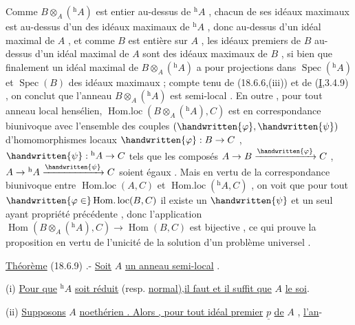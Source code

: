  Comme $B\otimes_A({}^{\mathrm h}A)$ est
entier au-dessus de $ {}^{\mathrm h}A$ , chacun de ses idéaux maximaux est au-dessus d'un
des idéaux maximaux de $ {}^{\mathrm h}A$ , donc au-dessus d'un idéal maximal de $A$ , et comme
$B$ est entière sur $A$ , les idéaux premiers de $B$ au-dessus d'un idéal maximal
de $A$ sont des idéaux maximaux de $B$ , si bien que finalement un idéal maximal
de $B\otimes_A({}^{\mathrm h}A)$ a pour projections dans $\operatorname{Spec}({}^{\mathrm h}A)$ et $\operatorname{Spec}(B)$ des idéaux maximaux
; compte tenu de (18.6.6,(iii)) et de (\uline{I},3.4.9) , on conclut que l'anneau
$B\otimes_A({}^{\mathrm h}A)$ est semi-local . En outre , pour tout anneau local hensélien,
$\operatorname{Hom.loc}(B\otimes_A({}^{\mathrm h}A),C)$ est en correspondance biunivoque avec l'ensemble des
couples $(\handwritten{\varphi},\handwritten{\psi})$ d'homomorphismes locaux $\handwritten{\varphi}:B\to C$ , $\handwritten{\psi}:{}^{\mathrm h}A\to C$ tels que les composés
$A\to B\xrightarrow{\handwritten{\varphi}}C$ , $A\to{}^{\mathrm h}A\xrightarrow{\handwritten{\psi}}C$ soient égaux . Mais  en vertu
de la correspondance biunivoque entre $\operatorname{Hom.loc}(A,C)$ et $\operatorname{Hom.loc}({}^{\mathrm h}A,C)$ , on
voit que pour tout $\handwritten{\varphi\in}\operatorname{Hom.loc}(B,C)$ il existe un $\handwritten{\psi}$ et un seul ayant   propriété
précédente , donc l'application $\operatorname{Hom}(B\otimes_A({}^{\mathrm h}A),C)\to\operatorname{Hom}(B,C)$ est bijective
, ce qui prouve la proposition en vertu de l'unicité de la solution
d'un problème universel .

\uline{Théorème} (18.6.9) .- \uline{Soit} $A$ \uline{un anneau semi-local} .

(i) \uline{Pour que} $ {}^{\mathrm h}A$ \uline{soit réduit} (resp. \uline{normal),il faut et il suffit que} $A$ \uline{le soi}.

(ii) \uline{Supposons} $A$ \uline{noethérien . Alors , pour tout idéal premier} $\underline p$ \uline{de} $A$ , \uline{l'an}-
